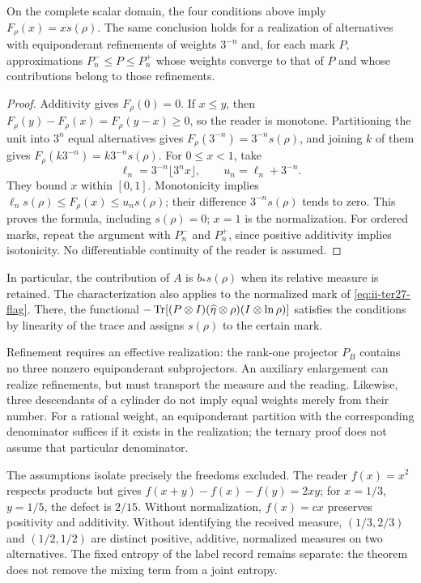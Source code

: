 \begin{theorem}
\label{thm:ii-tins-additive}
On the complete scalar domain, the four conditions above imply
$F_\rho(x)=xs(\rho)$. The same conclusion holds for a realization of
alternatives with equiponderant refinements of weights $3^{-n}$ and,
for each mark $P$, approximations $P_n^-\le P\le P_n^+$ whose weights
converge to that of $P$ and whose contributions belong to those refinements.
\end{theorem}
\begin{proof}
Additivity gives $F_\rho(0)=0$. If $x\le y$, then
$F_\rho(y)-F_\rho(x)=F_\rho(y-x)\ge0$, so the reader is monotone.
Partitioning the unit into $3^n$ equal alternatives gives
$F_\rho(3^{-n})=3^{-n}s(\rho)$, and joining $k$ of them gives
$F_\rho(k3^{-n})=k3^{-n}s(\rho)$. For $0\le x<1$, take
\[
 \ell_n=3^{-n}\lfloor3^nx\rfloor,\qquad u_n=\ell_n+3^{-n}.
\]
They bound $x$ within $[0,1]$. Monotonicity implies
$\ell_ns(\rho)\le F_\rho(x)\le u_ns(\rho)$; their difference
$3^{-n}s(\rho)$ tends to zero. This proves the formula, including
$s(\rho)=0$; $x=1$ is the normalization. For ordered marks, repeat the
argument with $P_n^-$ and $P_n^+$, since positive additivity implies
isotonicity. No differentiable continuity of the reader is assumed.
\end{proof}

In particular, the contribution of $A$ is $b_*s(\rho)$ when its relative
measure is retained. The characterization also applies to the normalized
mark of \eqref{eq:ii-ter27-flag}. There, the functional
$-\operatorname{Tr}[(P\otimes I)(\widehat\eta\otimes\rho)(I\otimes\ln\rho)]$
satisfies the conditions by linearity of the trace and assigns $s(\rho)$
to the certain mark.

Refinement requires an effective realization: the rank-one projector
$P_B$ contains no three nonzero equiponderant subprojectors. An auxiliary
enlargement can realize refinements, but must transport the measure and
the reading. Likewise, three descendants of a cylinder do not imply
equal weights merely from their number. For a rational weight, an
equiponderant partition with the corresponding denominator suffices if
it exists in the realization; the ternary proof does not assume that
particular denominator.

The assumptions isolate precisely the freedoms excluded. The reader
$f(x)=x^2$ respects products but gives
$f(x+y)-f(x)-f(y)=2xy$; for $x=1/3$, $y=1/5$, the defect is $2/15$.
Without normalization, $f(x)=cx$ preserves positivity and additivity.
Without identifying the received measure, $(1/3,2/3)$ and $(1/2,1/2)$
are distinct positive, additive, normalized measures on two alternatives.
The fixed entropy of the label record remains separate: the theorem
does not remove the mixing term from a joint entropy.

